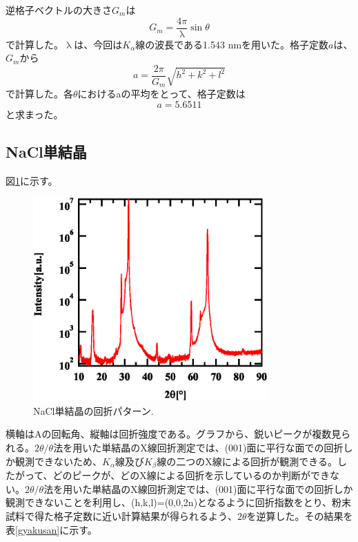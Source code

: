 \documentclass[11pt,a4j,uplatex]{jsarticle}
\begin{document}
\newpage
逆格子ベクトルの大きさ$G_{m}$は
\begin{equation}
 G_m=\frac{4\pi}{\uplambda}\sin\theta
 \label{gyakukousi}
\end{equation}
で計算した。$\uplambda$は、今回は$K_\alpha$線の波長である1.543 nmを用いた。格子定数$a$は、$G_{m}$から
\begin{equation}
 a=\frac{2\pi}{G_m}\sqrt{h^2+k^2+l^2}
 \label{kousiteisuu}
\end{equation}
で計算した。各$\theta$におけるaの平均をとって、格子定数は
\begin{equation}
 \nonumber
 a=5.6511
 \label{complete}
\end{equation}
と求まった。

\newpage
\subsection{NaCl単結晶}



図\ref{bulk}に示す。

\begin{figure}[htb]
 \centering
 \includegraphics[clip,width=9cm]{FigBulk.eps}
 \caption{NaCl単結晶の回折パターン.}
 \label{bulk}
\end{figure}

横軸はAの回転角、縦軸は回折強度である。グラフから、鋭いピークが複数見られる。$2\theta/\theta$法を用いた単結晶のX線回折測定では、(001)面に平行な面での回折しか観測できないため、$K_\alpha$線及び$K_\beta$線の二つのX線による回折が観測できる。したがって、どのピークが、どのX線による回折を示しているのか判断ができない。$2\theta/\theta$法を用いた単結晶のX線回折測定では、(001)面に平行な面での回折しか観測できないことを利用し、(h,k,l)=(0,0,2n)となるように回折指数をとり、粉末試料で得た格子定数に近い計算結果が得られるよう、$2\theta$を逆算した。その結果を表\ref{gyakusan}に示す。
\end{document}
